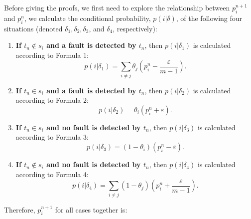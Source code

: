 \documentclass[10pt,journal,cspaper,compsoc,onecolumn]{IEEEtran}
\begin{document}
Before giving the proofs, we first need to explore the relationship between $p_i^{n + 1}$ and $p_i^{n}$, we calculate the conditional probability, $p(i|\delta)$, of the following four situations (denoted $\delta_1, \delta_2, \delta_3$, and $\delta_4$, respectively):

\begin{enumerate}
  \item
  \textbf{If $t_{n} \notin s_i$ and a fault is detected by $t_n$}, then $p(i|\delta_1)$ is calculated according to Formula 1:
    $$p(i|\delta_1) = \sum_{i \neq j}\theta_j(p_i^n - \displaystyle\frac{\varepsilon}{m - 1}).$$

  \item
  \textbf{If $t_{n} \in s_i$ and a fault is detected by $t_n$}, then $p(i|\delta_2)$ is calculated according to Formula 2:
    $$p(i|\delta_2) = \theta_i(p_i^n + \varepsilon).$$

  \item
  \textbf{If $t_{n} \in s_i$ and no fault is detected by $t_n$}, then $p(i|\delta_3)$ is calculated according to Formula 3:
    $$p(i|\delta_3) = (1 - \theta_i)(p_i^n - \varepsilon).$$

  \item
  \textbf{If $t_{n} \notin s_i$ and no fault is detected by $t_n$}, then $p(i|\delta_4)$ is calculated according to Formula 4:
    $$p(i|\delta_4) = \sum_{i \neq j}(1 - \theta_j)(p_i^n + \displaystyle\frac{\varepsilon}{m - 1}).$$
\end{enumerate}

Therefore, $p_i^{n + 1}$ for all cases together is:
\end{document}
